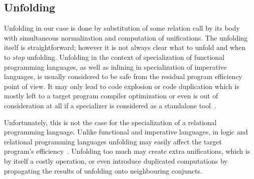 

\subsection{Unfolding}

Unfolding in our case is done by substitution of some relation call by its body with simultaneous normalization and computation of unifications.
The unfolding itself is straightforward; however it is not always clear what to unfold and when to \emph{stop} unfolding.
Unfolding in the context of specialization of functional programming languages, as well as inlining in specialization of imperative languages, is usually considered to be safe from the residual program efficiency point of view.
It may only lead to code explosion or code duplication which is mostly left to a target program compiler optimization or even is out of consideration at all if a specializer is considered as a standalone tool~\cite{jonesbook}.

Unfortunately, this is not the case for the specialization of a relational programming language.
Unlike functional and imperative languages, in logic and relational programming languages unfolding may easily affect the target program's efficiency~\cite{leuschel2002logic}.
Unfolding too much may create extra unifications, which is by itself a costly operation, or even introduce duplicated computations by propagating the results of unfolding onto neighbouring conjuncts.

